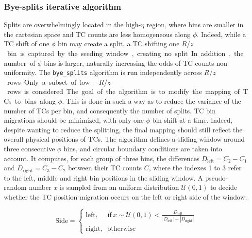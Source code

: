 \documentclass[11pt]{article}
\newcommand{\azimuth}{$\phi$}
\newcommand{\bsplits}{\texttt{bye\_splits}}
\newcommand{\rapidity}{$\eta$}
\newcommand{\rz}{$R$/$z$}
\begin{document}
\subsubsection{Bye-splits iterative algorithm}
\label{sec:org74895a0}
Splits are overwhelmingly located in the high-\rapidity{} region, where bins are smaller in the cartesian space and \ac{TC} counts are less homogeneous along \azimuth{}.
Indeed, while a \ac{TC} shift of one \azimuth{} bin may create a split, a \ac{TC} shifting one \si{\rz} bin is captured by the seeding window, creating no split.
In addition, the number of \azimuth{} bins is larger, naturally increasing the odds of \ac{TC} counts non-uniformity.
The \bsplits{} algorithm is run independently across \si{\rz} rows.
Only a subset of low-\si{\rz} rows is considered.
The goal of the algorithm is to modify the mapping of \acp{TC} to bins along \azimuth{}.
This is done in such a way as to reduce the variance of the number of \acp{TC} per bin, and consequently the number of splits.
\ac{TC} bin migrations should be minimized, with only one \azimuth{} bin shift at a time.
Indeed, despite wanting to reduce the splitting, the final mapping should still reflect the overall physical positions of TCs.
The algorithm defines a sliding window around three consecutive \azimuth{} bins, and circular boundary conditions are taken into account.
It computes, for each group of three bins, the differences \(D_{\text{left}} = C_{2} - C_{1}\) and \(D_{\text{right}} = C_{3} - C_{2}\) between their \ac{TC} counts \(C\),
where the indexes 1 to 3 refer to the left, middle and right bin positions in the sliding window.
A pseudo-random number \(x\) is sampled from an uniform distribution \(\mathcal{U}(0,1)\) to decide whether the \ac{TC} position migration occurs on the left or right side of the window:

\begin{equation}
\label{eq:side}
   \text{Side}=
   \begin{cases}
     \text{left}, & \text{if}\ x\sim\mathcal{U}(0,1) < \frac{D_{\text{left}}}{|D_{\text{left}}|+|D_{\text{right}}|} \\
     \text{right}, & \text{otherwise}
   \end{cases}
\end{equation}
\end{document}
